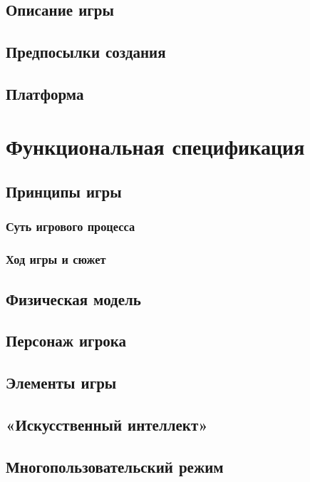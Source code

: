 \documentclass{article}
\begin{document}
\subsection{Описание игры}

\subsection{Предпосылки создания}

\subsection{Платформа}

\section{Функциональная спецификация}

\subsection{Принципы игры}

\subsubsection{Суть игрового процесса}

\subsubsection{Ход игры и сюжет}

\subsection{Физическая модель}

\subsection{Персонаж игрока}

\subsection{Элементы игры}

\subsection{«Искусственный интеллект»}

\subsection{Многопользовательский режим}
\end{document}
